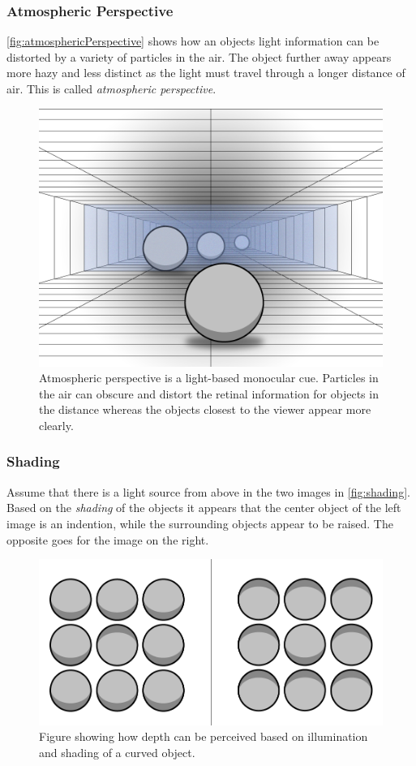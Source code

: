 \subsubsection{Atmospheric Perspective}
\autoref{fig:atmosphericPerspective} shows how an objects light information can be distorted by a variety of particles in the air. The object further away appears more hazy and less distinct as the light must travel through a longer distance of air. This is called \textit{atmospheric perspective}\citep{sensationPerception}.
\begin{figure}[H]
	\centering
	\includegraphics[width=0.8\linewidth]{figure/Analysis/atmosphericPerspective2.png}
	\caption{Atmospheric perspective is a light-based monocular cue. Particles in the air can obscure and distort the retinal information for objects in the distance whereas the objects closest to the viewer appear more clearly.}
	\label{fig:atmosphericPerspective}
\end{figure}

\subsubsection{Shading}
Assume that there is a light source from above in the two images in \autoref{fig:shading}. Based on the \textit{shading} of the objects it appears that the center object of the left image is an indention, while the surrounding objects appear to be raised. The opposite goes for the image on the right\citep{sensationPerception}.
\begin{figure}[H]
	\centering
	\includegraphics[width=0.8\linewidth]{figure/Analysis/shading.png}
	\caption{Figure showing how depth can be perceived based on illumination and shading of a curved object.}
	\label{fig:shading}
\end{figure}

